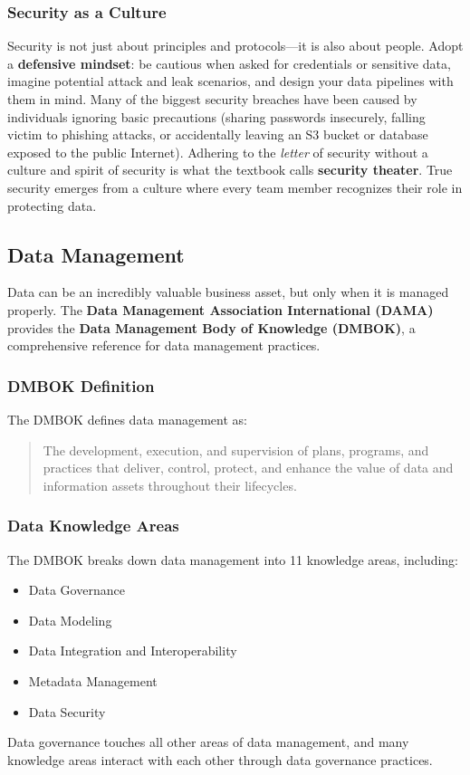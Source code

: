 \documentclass{article}
\begin{document}
\subsubsection{Security as a Culture}
Security is not just about principles and protocols---it is also about people. Adopt a \textbf{defensive mindset}: be cautious when asked for credentials or sensitive data, imagine potential attack and leak scenarios, and design your data pipelines with them in mind. Many of the biggest security breaches have been caused by individuals ignoring basic precautions (sharing passwords insecurely, falling victim to phishing attacks, or accidentally leaving an S3 bucket or database exposed to the public Internet). Adhering to the \textit{letter} of security without a culture and spirit of security is what the textbook calls \textbf{security theater}. True security emerges from a culture where every team member recognizes their role in protecting data.

\subsection{Data Management}
Data can be an incredibly valuable business asset, but only when it is managed properly. The \textbf{Data Management Association International (DAMA)} provides the \textbf{Data Management Body of Knowledge (DMBOK)}, a comprehensive reference for data management practices.

\subsubsection{DMBOK Definition}
The DMBOK defines data management as:
\begin{quote}
    The development, execution, and supervision of plans, programs, and practices that deliver, control, protect, and enhance the value of data and information assets throughout their lifecycles.
\end{quote}

\subsubsection{Data Knowledge Areas}
The DMBOK breaks down data management into 11 knowledge areas, including:
\begin{itemize}
    \item Data Governance
    \item Data Modeling
    \item Data Integration and Interoperability
    \item Metadata Management
    \item Data Security
\end{itemize}
Data governance touches all other areas of data management, and many knowledge areas interact with each other through data governance practices.
\end{document}
